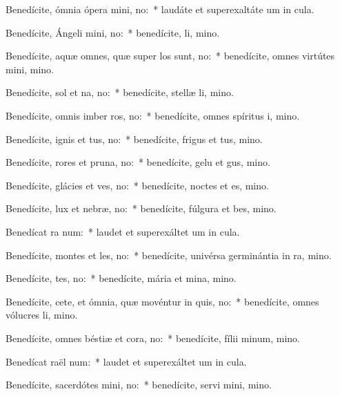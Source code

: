 \item Benedícite, ómnia ópera mini, no:~* laudáte et superexaltáte um in cula.
\item Benedícite, Ángeli mini, no:~* benedícite, li, mino.
\item Benedícite, aquæ omnes, quæ super los sunt, no:~* benedícite, omnes virtútes mini, mino.
\item Benedícite, sol et na, no:~* benedícite, stellæ li, mino.
\item Benedícite, omnis imber  ros, no:~* benedícite, omnes spíritus i, mino.
\item Benedícite, ignis et tus, no:~* benedícite, frigus et tus, mino.
\item Benedícite, rores et pruna, no:~* benedícite, gelu et gus, mino.
\item Benedícite, glácies et ves, no:~* benedícite, noctes et es, mino.
\item Benedícite, lux et nebræ, no:~* benedícite, fúlgura et bes, mino.
\item Benedícat ra num:~* laudet et superexáltet um in cula.
\item Benedícite, montes et les, no:~* benedícite, univérsa germinántia in ra, mino.
\item Benedícite, tes, no:~* benedícite, mária et mina, mino.
\item Benedícite, cete, et ómnia, quæ movéntur in quis, no:~* benedícite, omnes vólucres li, mino.
\item Benedícite, omnes béstiæ et cora, no:~* benedícite, fílii minum, mino.
\item Benedícat raël num:~* laudet et superexáltet um in cula.
\item Benedícite, sacerdótes mini, no:~* benedícite, servi mini, mino.

